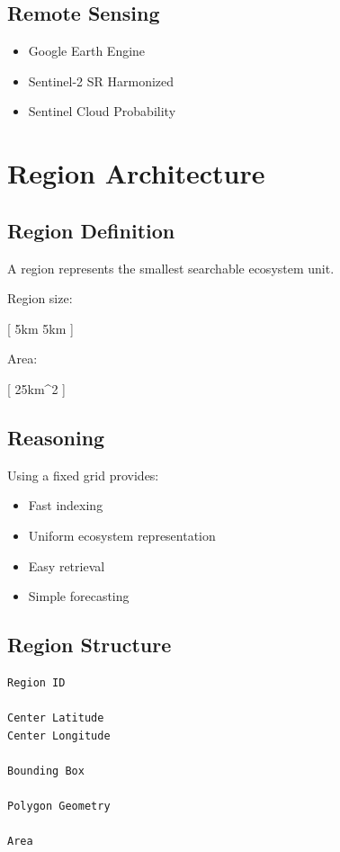 \documentclass[11pt,a4paper]{article}
\begin{document}
\subsection{Remote Sensing}

\begin{itemize}
\item Google Earth Engine
\item Sentinel-2 SR Harmonized
\item Sentinel Cloud Probability
\end{itemize}

\section{Region Architecture}

\subsection{Region Definition}

A region represents the smallest searchable
ecosystem unit.

Region size:

[
5km \times 5km
]

Area:

[
25km^2
]

\subsection{Reasoning}

Using a fixed grid provides:

\begin{itemize}
\item Fast indexing
\item Uniform ecosystem representation
\item Easy retrieval
\item Simple forecasting
\end{itemize}

\subsection{Region Structure}

\begin{verbatim}
Region ID

Center Latitude
Center Longitude

Bounding Box

Polygon Geometry

Area
\end{verbatim}
\end{document}
